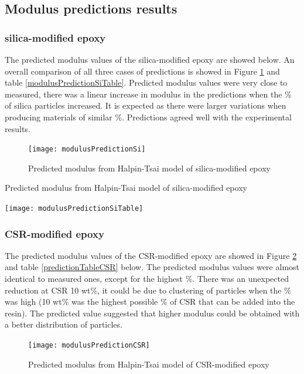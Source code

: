 \documentclass[numbers=noendperiod,chapterprefix=on]{icldt} %
\begin{document}
\subsection{Modulus predictions results}

\subsubsection{silica-modified epoxy}
The predicted modulus values of the silica-modified epoxy are showed below. An overall comparison of all three cases of predictions is showed in Figure \ref{modulusPredictionSi} and table \ref{modulusPredictionSiTable}. Predicted modulus values were very close to measured, there was a linear increase in modulus in the predictions when the \% of silica particles increased. It is expected as there were larger variations when producing materials of similar \%. Predictions agreed well with the experimental results. 

\begin{figure}[!htpb]
\centering
\texttt{[image: modulusPredictionSi]}
\caption{Predicted modulus from Halpin-Tsai model of silica-modified epoxy} \label{modulusPredictionSi}
\end{figure}
\FloatBarrier

\begin{table}[!htpb]
\centering
\caption{Predicted modulus from Halpin-Tsai model of silica-modified epoxy} \label{modulusPredictionSiTable}
\texttt{[image: modulusPredictionSiTable]}
\end{table}
\FloatBarrier

\subsubsection{CSR-modified epoxy}
The predicted modulus values of the CSR-modified epoxy are showed in Figure \ref{modulusPredictionCSR} and table \ref{predictionTableCSR} below. The predicted modulus values were almost identical to measured ones, except for the highest \%. There was an unexpected reduction at CSR 10 wt\%, it could be due to clustering of particles when the \% was high (10 wt\% was the highest possible \% of CSR that can be added into the resin). The predicted value suggested that higher modulus could be obtained with a better distribution of particles. 

\begin{figure}[!htpb]
\centering
\texttt{[image: modulusPredictionCSR]}
\caption{Predicted modulus from Halpin-Tsai model of CSR-modified epoxy} \label{modulusPredictionCSR}
\end{figure}
\FloatBarrier
\end{document}
